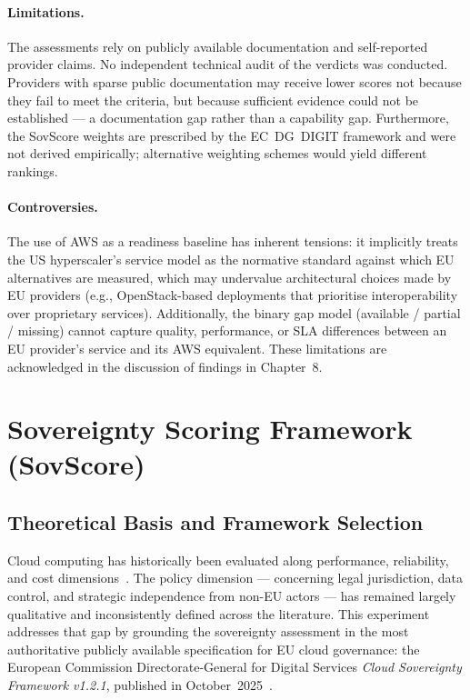 \paragraph{Limitations.}
The assessments rely on publicly available documentation and self-reported provider claims. No independent technical audit of the verdicts was conducted. Providers with sparse public documentation may receive lower scores not because they fail to meet the criteria, but because sufficient evidence could not be established — a documentation gap rather than a capability gap. Furthermore, the SovScore weights are prescribed by the EC~DG~DIGIT framework and were not derived empirically; alternative weighting schemes would yield different rankings.

\paragraph{Controversies.}
The use of AWS as a readiness baseline has inherent tensions: it implicitly treats the US hyperscaler's service model as the normative standard against which EU alternatives are measured, which may undervalue architectural choices made by EU providers (e.g., OpenStack-based deployments that prioritise interoperability over proprietary services). Additionally, the binary gap model (available / partial / missing) cannot capture quality, performance, or SLA differences between an EU provider's service and its AWS equivalent. These limitations are acknowledged in the discussion of findings in Chapter~8.

\section{Sovereignty Scoring Framework (SovScore)}
\label{sec:sovscore_methodology}

\subsection{Theoretical Basis and Framework Selection}

Cloud computing has historically been evaluated along performance, reliability, and cost dimensions~\cite{armbrust2010view, NIST_SP800145_2011}. The policy dimension — concerning legal jurisdiction, data control, and strategic independence from non-EU actors — has remained largely qualitative and inconsistently defined across the literature. This experiment addresses that gap by grounding the sovereignty assessment in the most authoritative publicly available specification for EU cloud governance: the European Commission Directorate-General for Digital Services \textit{Cloud Sovereignty Framework v1.2.1}, published in October~2025~\cite{EC_DIGIT_CloudSovereignty_2025}.

